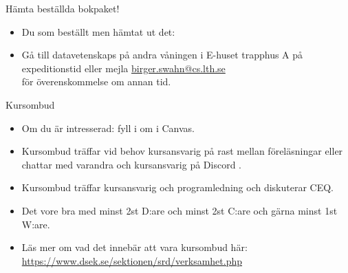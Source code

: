 
\ifkompendium\else
\begin{SlideExtra}{Hämta beställda bokpaket!}
  \begin{itemize}
    \item Du som beställt  men  hämtat ut det: \\
    \item[] Gå till datavetenskaps  på andra våningen i E-huset trapphus A på expeditionstid eller mejla \url{birger.swahn@cs.lth.se} \\ för överenskommelse om annan tid. 
  \end{itemize}
\end{SlideExtra}


  
\begin{SlideExtra}{Kursombud}
\begin{itemize}
\item Om du är intresserad: fyll i  om  i Canvas.
\item Kursombud träffar vid behov kursansvarig på rast mellan föreläsningar eller chattar med varandra och kursansvarig på Discord .
\item Kursombud träffar kursansvarig och programledning  och diskuterar  CEQ.
\item Det vore bra med minst 2st D:are och minst 2st C:are och gärna minst 1st W:are.
\item Läs mer om vad det innebär att vara kursombud här:\\{\SlideFontSmall\url{https://www.dsek.se/sektionen/srd/verksamhet.php}}
\end{itemize}
\end{SlideExtra}
\fi
